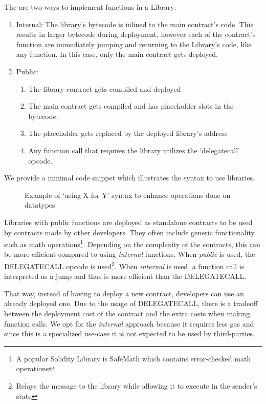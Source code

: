 The are two ways to implement functions in a Library:
\begin{enumerate}
    \item Internal: The library's bytecode is inlined to the main contract's code. This results in larger bytecode during deployment, however each of the contract's function are immediately jumping and returning to the Library's code, like any function. In this case, only the main contract gets deployed.
    \item Public: 
        \begin{enumerate}
            \item The library contract gets compiled and deployed
            \item The main contract gets compiled and has placeholder slots in the bytecode.
            \item The placeholder gets replaced by the deployed library's address
            \item Any function call that requires the library utilizes the `delegatecall' opcode.
        \end{enumerate}
\end{enumerate}

We provide a minimal code snippet which illustrates the syntax to use libraries. 

\begin{figure}[H]
    \centering
    
    \label{fig:library}
    \caption{Example of `using X for Y' syntax to enhance operations done on datatypes}
\end{figure}


Libraries with public functions are deployed as standalone contracts to be used by contracts made by other developers. They often include generic functionality such as math operations\footnote{A popular Solidity Library is SafeMath which contains error-checked math operations}. Depending on the complexity of the contracts, this can be more efficient compared to using \textit{internal} functions. When \textit{public} is used, the DELEGATECALL opcode is used\footnote{Relays the message to the library while allowing it to execute in the sender's state}. When \textit{internal} is used, a function call is interpreted as a jump and thus is more efficient than the DELEGATECALL. 

That way, instead of having to deploy a new contract, developers can use an already deployed one. Due to the usage of DELEGATECALL, there is a tradeoff between the deployment cost of the contract and the extra costs when making function calls. We opt for the \textit{internal} approach because it requires less gas and since this is a specialized use-case it is not expected to be used by third-parties.

